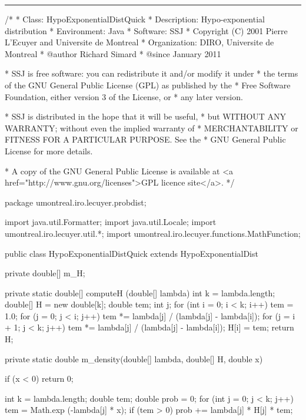 \bigskip\hrule

\begin{code}\begin{hide}
/*
 * Class:        HypoExponentialDistQuick
 * Description:  Hypo-exponential distribution
 * Environment:  Java
 * Software:     SSJ
 * Copyright (C) 2001  Pierre L'Ecuyer and Universite de Montreal
 * Organization: DIRO, Universite de Montreal
 * @author       Richard Simard
 * @since        January 2011

 * SSJ is free software: you can redistribute it and/or modify it under
 * the terms of the GNU General Public License (GPL) as published by the
 * Free Software Foundation, either version 3 of the License, or
 * any later version.

 * SSJ is distributed in the hope that it will be useful,
 * but WITHOUT ANY WARRANTY; without even the implied warranty of
 * MERCHANTABILITY or FITNESS FOR A PARTICULAR PURPOSE.  See the
 * GNU General Public License for more details.

 * A copy of the GNU General Public License is available at
   <a href="http://www.gnu.org/licenses">GPL licence site</a>.
 */
\end{hide}
package umontreal.iro.lecuyer.probdist;
\begin{hide}
import java.util.Formatter;
import java.util.Locale;
import umontreal.iro.lecuyer.util.*;
import umontreal.iro.lecuyer.functions.MathFunction;\end{hide}

public class HypoExponentialDistQuick extends HypoExponentialDist\begin{hide} {
   private double[] m_H;

   private static double[] computeH (double[] lambda) {
      int k = lambda.length;
      double[] H = new double[k];
      double tem;
      int j;
      for (int i = 0; i < k; i++) {
         tem = 1.0;
         for (j = 0; j < i; j++)
            tem *= lambda[j] / (lambda[j] - lambda[i]);
         for (j = i + 1; j < k; j++)
            tem *= lambda[j] / (lambda[j] - lambda[i]);
         H[i] = tem;
      }
      return H;
   }


   private static double m_density(double[] lambda, double[] H, double x) {
      if (x < 0)
         return 0;

      int k = lambda.length;
      double tem;
      double prob = 0;
      for (int j = 0; j < k; j++) {
         tem = Math.exp (-lambda[j] * x);
         if (tem > 0)
            prob += lambda[j] * H[j] * tem;
      }

}}
\end{hide}
\end{code}
